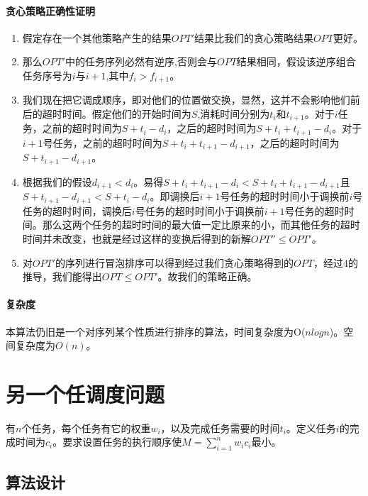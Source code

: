 \paragraph*{贪心策略正确性证明}
\begin{enumerate}
    \item 假定存在一个其他策略产生的结果$OPT'$结果比我们的贪心策略结果$OPT$更好。
    \item 那么$OPT'$中的任务序列必然有逆序,否则会与$OPT$结果相同，假设该逆序组合任务序号为$i$与$i+1$,其中$f_i>f_{i+1}$。
    \item 我们现在把它调成顺序，即对他们的位置做交换，显然，这并不会影响他们前后的超时时间。假定他们的开始时间为$S$,消耗时间分别为$t_i$和$t_{i+1}$。对于$i$任务，之前的超时时间为$S+t_i-d_i$，之后的超时时间为$S+t_i+t_{i+1}-d_i$。对于$i+1$号任务，之前的超时时间为$S+t_i+t_{i+1}-d_{i+1}$，之后的超时时间为$S+t_{i+1}-d_{i+1}$。
    \item 根据我们的假设$d_{i+1}<d_i$。易得$S+t_i+t_{i+1}-d_i<S+t_i+t_{i+1}-d_{i+1}$且$S+t_{i+1}-d_{i+1}<S+t_i-d_i$。即调换后$i+1$号任务的超时时间小于调换前$i$号任务的超时时间，调换后$i$号任务的超时时间小于调换前$i+1$号任务的超时时间。那么这两个任务的超时时间的最大值一定比原来的小，而其他任务的超时时间并未改变，也就是经过这样的变换后得到的新解$OPT'' \leq OPT'$。
    \item 对$OPT'$的序列进行冒泡排序可以得到经过我们贪心策略得到的$OPT$，经过4的推导，我们能得出$OPT \leq OPT'$。故我们的策略正确。
\end{enumerate}

\paragraph*{复杂度}
本算法仍旧是一个对序列某个性质进行排序的算法，时间复杂度为O($nlogn$)。空间复杂度为$O(n)$。

\section{另一个任调度问题}
\begin{example}
    有$n$个任务，每个任务有它的权重$w_i$，以及完成任务需要的时间$t_i$。定义任务$i$的完成时间为$c_i$。要求设置任务的执行顺序使$M = \sum_{i=1}^n {w_ic_i}$最小。
\end{example}

\subsection{算法设计}

